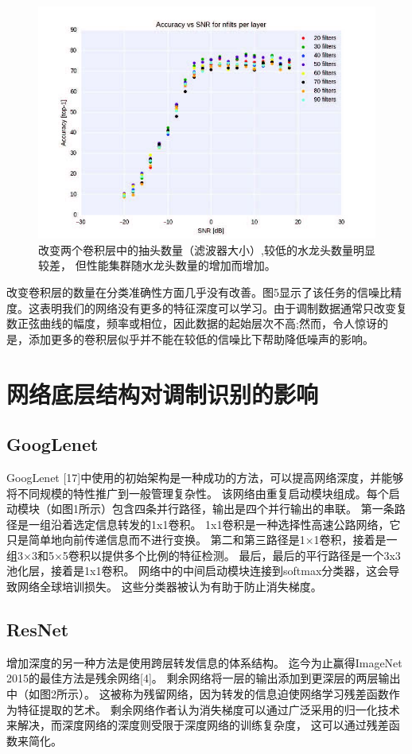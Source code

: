 \begin{figure}[!h]
	\centering
	\includegraphics[scale=1]{figures/chapter_5/fig1}
	\caption{改变两个卷积层中的抽头数量（滤波器大小）,较低的水龙头数量明显较差，
		但性能集群随水龙头数量的增加而增加。}\label{fig_5_1}
\end{figure}

改变卷积层的数量在分类准确性方面几乎没有改善。图5显示了该任务的信噪比精度。这表明我们的网络没有更多的特征深度可以学习。由于调制数据通常只改变复数正弦曲线的幅度，频率或相位，因此数据的起始层次不高;然而，令人惊讶的是，添加更多的卷积层似乎并不能在较低的信噪比下帮助降低噪声的影响。\par


\section{网络底层结构对调制识别的影响}
\subsection{GoogLenet}
GoogLenet [17]中使用的初始架构是一种成功的方法，可以提高网络深度，并能够将不同规模的特性推广到一般管理复杂性。
该网络由重复启动模块组成。每个启动模块（如图1所示）包含四条并行路径，输出是四个并行输出的串联。
第一条路径是一组沿着选定信息转发的1x1卷积。
1x1卷积是一种选择性高速公路网络，它只是简单地向前传递信息而不进行变换。
第二和第三路径是1×1卷积，接着是一组3×3和5×5卷积以提供多个比例的特征检测。
最后，最后的平行路径是一个3x3池化层，接着是1x1卷积。
网络中的中间启动模块连接到softmax分类器，这会导致网络全球培训损失。
这些分类器被认为有助于防止消失梯度。\par

\subsection{ResNet}
增加深度的另一种方法是使用跨层转发信息的体系结构。
迄今为止赢得ImageNet 2015的最佳方法是残余网络[4]。
剩余网络将一层的输出添加到更深层的两层输出中（如图2所示）。
这被称为残留网络，因为转发的信息迫使网络学习残差函数作为特征提取的艺术。 
剩余网络作者认为消失梯度可以通过广泛采用的归一化技术来解决，而深度网络的深度则受限于深度网络的训练复杂度，
这可以通过残差函数来简化。\par


